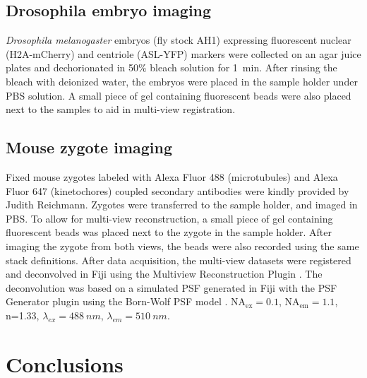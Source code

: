   \subsection{Drosophila embryo imaging}
    \textit{Drosophila melanogaster} embryos (fly stock AH1) expressing fluorescent nuclear (H2A-mCherry) and centriole (ASL-YFP) markers were collected on an agar juice plates and dechorionated in 50\% bleach solution for \SI{1}{min}. After rinsing the bleach with deionized water, the embryos were placed in the sample holder under PBS solution. A small piece of gel containing fluorescent beads were also placed next to the samples to aid in multi-view registration.

  \subsection{Mouse zygote imaging}
    Fixed mouse zygotes labeled with Alexa Fluor 488 (microtubules) and Alexa Fluor 647 (kinetochores) coupled secondary antibodies were kindly provided by Judith Reichmann. Zygotes were transferred to the sample holder, and imaged in PBS. To allow for multi-view reconstruction, a small piece of gel containing fluorescent beads was placed next to the zygote in the sample holder. After imaging the zygote from both views, the beads were also recorded using the same stack definitions. After data acquisition, the multi-view datasets were registered and deconvolved in Fiji \cite{schindelin_fiji:_2012} using the Multiview Reconstruction Plugin \cite{preibisch_software_2010,preibisch_efficient_2014}. The deconvolution was based on a simulated PSF generated in Fiji with the PSF Generator plugin \cite{kirshner_3d_2011} using the Born-Wolf PSF model \cite{born_principles_2013}. $\mathrm{NA_{ex}}=0.1$, $\mathrm{NA_{em}}=1.1$, n=1.33, $\lambda_{ex} = \SI{488}{nm}$, $\lambda_{em} = \SI{510}{nm}$.

  



\section{Conclusions}

